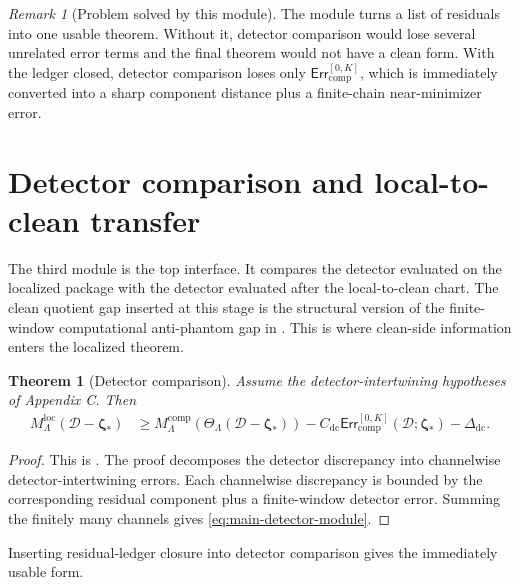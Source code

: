 \documentclass[11pt]{article}
\numberwithin{equation}{section}
\newtheorem{theorem}{Theorem}[section]
\theoremstyle{definition}
\theoremstyle{remark}
\newtheorem{remark}[remark]{Remark}
\newcommand{\loc}{\mathrm{loc}}
\newcommand{\comp}{\mathrm{comp}}
\newcommand{\Err}{\mathsf{Err}}
\newcommand{\calD}{\mathcal D}
\newcommand{\bzeta}{\boldsymbol\zeta}
\begin{document}
\begin{remark}[Problem solved by this module]
The module turns a list of residuals into one usable theorem.  Without it, detector comparison would lose several unrelated error terms and the final theorem would not have a clean form.  With the ledger closed, detector comparison loses only \(\Err_{\comp}^{[0,K]}\), which is immediately converted into a sharp component distance plus a finite-chain near-minimizer error.
\end{remark}

\section{Detector comparison and local-to-clean transfer}\label{sec:detector-module-main}

The third module is the top interface.  It compares the detector evaluated on the localized package with the detector evaluated after the local-to-clean chart.  The clean quotient gap inserted at this stage is the structural version of the finite-window computational anti-phantom gap in \cite{YuComputationalAntiPhantom2026}.  This is where clean-side information enters the localized theorem.

\begin{theorem}[Detector comparison]\label{thm:main-detector-module}
Assume the detector-intertwining hypotheses of Appendix C.  Then
\begin{equation}\label{eq:main-detector-module}
\begin{aligned}
        M_{\Lambda}^{\loc}(\calD-\bzeta_*)
        &\ge
        M_{\Lambda}^{\comp}(\Theta_{\Lambda}(\calD-\bzeta_*))
        -
        C_{\mathrm{dc}}
        \Err_{\comp}^{[0,K]}(\calD;\bzeta_*)
        -
        \Delta_{\mathrm{dc}}.
\end{aligned}
\end{equation}
\end{theorem}

\begin{proof}
This is .  The proof decomposes the detector discrepancy into channelwise detector-intertwining errors.  Each channelwise discrepancy is bounded by the corresponding residual component plus a finite-window detector error.  Summing the finitely many channels gives \eqref{eq:main-detector-module}.
\end{proof}

Inserting residual-ledger closure into detector comparison gives the immediately usable form.
\end{document}
